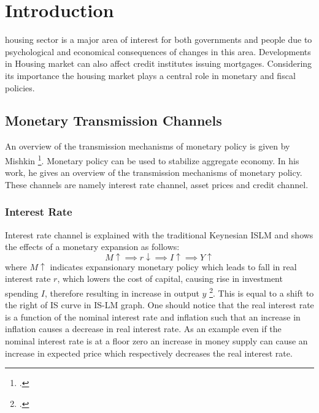 \section{Introduction}
housing sector is a major area of interest for both governments and people due to psychological and economical consequences of changes in this area. Developments in Housing market can also affect credit institutes issuing mortgages. Considering its importance the housing market plays a central role in monetary and fiscal policies. 
\subsection{Monetary Transmission Channels}
An overview of the transmission mechanisms of monetary policy is given by Mishkin \footcite[See.][]{Mishkin1996}. Monetary policy can be used to stabilize aggregate economy. In his work, he gives an overview of the transmission mechanisms of monetary policy. These channels are namely interest rate channel, asset prices and credit channel. 

\subsubsection{Interest Rate}
Interest rate channel is explained with the traditional Keynesian ISLM and shows the effects of a monetary expansion as follows:
  \[M \uparrow \implies r \downarrow \implies I \uparrow \implies Y \uparrow\]
where $ M \uparrow $ indicates expansionary monetary policy which leads to fall in real interest rate $r$, which lowers the cost of capital, causing rise in investment spending $I$, therefore resulting in increase in output $y$  \footcite[See.][]{Mishkin1996}.
This is equal to a shift to the right of IS curve in IS-LM graph. One should notice that the real interest rate is a function of the nominal interest rate and inflation such that an increase in inflation causes a decrease in real interest rate. As an example even if the nominal interest rate is at a floor zero an increase in money supply can cause an increase in expected price which respectively decreases the real interest rate.



